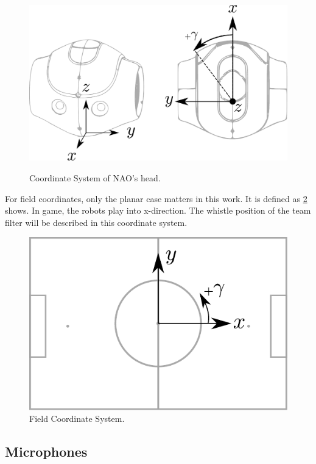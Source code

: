 \begin{figure}[ht]
      \centering
      \includegraphics[width=0.60\columnwidth]{figures/nao_coor_both}
      \label{fig:03_naoCoordinate}
      \caption{Coordinate System of NAO's head.}
\end{figure}

For field coordinates, only the planar case matters in this work.
It is defined as \cref{fig:03_fieldCoordinates} shows.
In game, the robots play into x-direction.
The whistle position of the team filter will be described
in this coordinate system.
\begin{figure}[ht]
      \centering
      \includegraphics[width=0.50\columnwidth]{figures/field}
      \caption{Field Coordinate System.}
      \label{fig:03_fieldCoordinates}
\end{figure}

\subsection{Microphones}
\label{subsec:03_microphones}


